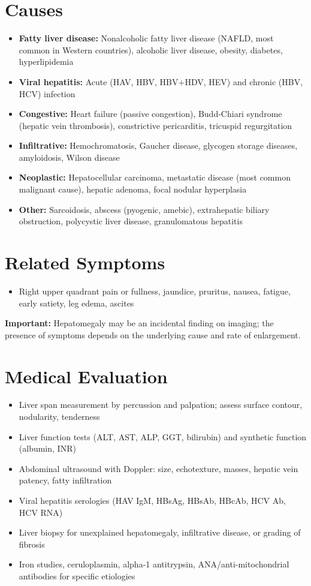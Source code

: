 \section*{Causes}
\begin{itemize}
  \item \textbf{Fatty liver disease:} Nonalcoholic fatty liver disease (NAFLD, most common in Western countries), alcoholic liver disease, obesity, diabetes, hyperlipidemia
  \item \textbf{Viral hepatitis:} Acute (HAV, HBV, HBV+HDV, HEV) and chronic (HBV, HCV) infection
  \item \textbf{Congestive:} Heart failure (passive congestion), Budd-Chiari syndrome (hepatic vein thrombosis), constrictive pericarditis, tricuspid regurgitation
  \item \textbf{Infiltrative:} Hemochromatosis, Gaucher disease, glycogen storage diseases, amyloidosis, Wilson disease
  \item \textbf{Neoplastic:} Hepatocellular carcinoma, metastatic disease (most common malignant cause), hepatic adenoma, focal nodular hyperplasia
  \item \textbf{Other:} Sarcoidosis, abscess (pyogenic, amebic), extrahepatic biliary obstruction, polycystic liver disease, granulomatous hepatitis
\end{itemize}

\section*{Related Symptoms}
\begin{itemize}
  \item Right upper quadrant pain or fullness, jaundice, pruritus, nausea, fatigue, early satiety, leg edema, ascites
\end{itemize}
\textbf{Important:} Hepatomegaly may be an incidental finding on imaging; the presence of symptoms depends on the underlying cause and rate of enlargement.

\section*{Medical Evaluation}
\begin{itemize}
  \item Liver span measurement by percussion and palpation; assess surface contour, nodularity, tenderness
  \item Liver function tests (ALT, AST, ALP, GGT, bilirubin) and synthetic function (albumin, INR)
  \item Abdominal ultrasound with Doppler: size, echotexture, masses, hepatic vein patency, fatty infiltration
  \item Viral hepatitis serologies (HAV IgM, HBsAg, HBsAb, HBcAb, HCV Ab, HCV RNA)
  \item Liver biopsy for unexplained hepatomegaly, infiltrative disease, or grading of fibrosis
  \item Iron studies, ceruloplasmin, alpha-1 antitrypsin, ANA/anti-mitochondrial antibodies for specific etiologies
\end{itemize}

